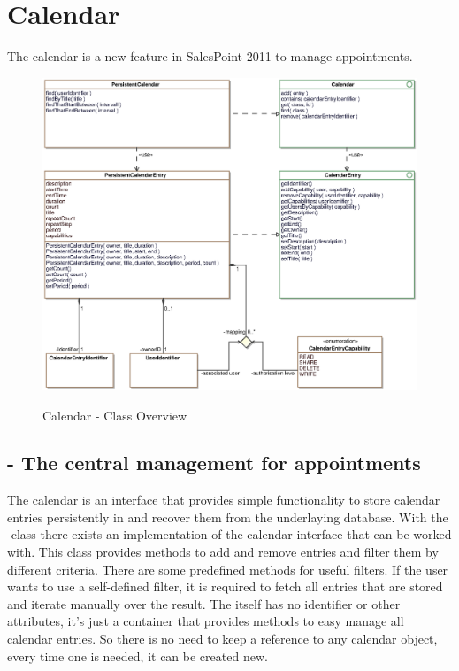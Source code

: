 \newpage
\section{Calendar}

The calendar is a new feature in SalesPoint 2011 to manage appointments. 

\begin{figure}[ht]
	\centering
  \includegraphics[width=1.0\textwidth]{images/Calendar_Overview.eps}
	\label{calendar_overview}
	\caption{Calendar - Class Overview}
\end{figure}

\subsection{ - The central management for appointments}
The calendar is an interface that provides simple functionality to store calendar entries persistently in and recover them from the underlaying database.
With the -class there exists an implementation of the calendar interface that can be worked with. This class provides methods
to add and remove entries and filter them by different criteria.
There are some predefined methods for useful filters. If the user wants to use a self-defined filter, it is required to fetch all entries that are stored and
iterate manually over the result.  
The  itself has no identifier or other attributes, it's just a container that provides methods to easy manage all calendar entries.
So there is no need to keep a reference to any calendar object, every time one is needed, it can be created new.


